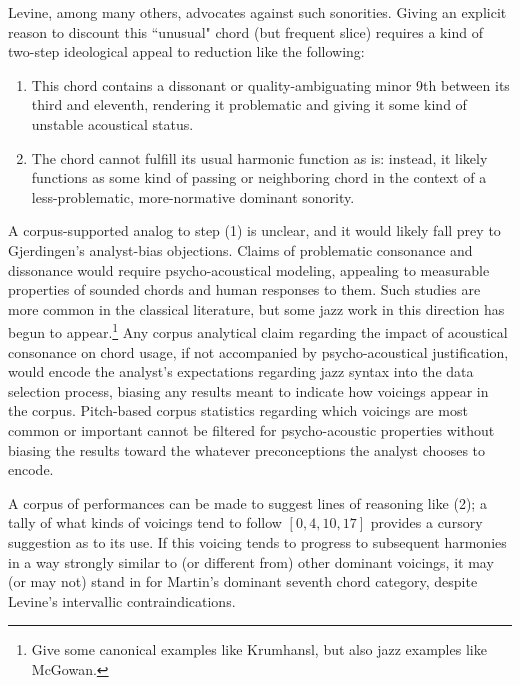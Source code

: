 Levine, among many others, advocates against such sonorities.  Giving an explicit reason to discount this ``unusual" chord (but frequent slice) requires a kind of two-step ideological appeal to reduction like the following:
\begin{enumerate}
	\item This chord contains a dissonant or quality-ambiguating minor 9th between its third and eleventh, rendering it problematic and giving it some kind of unstable acoustical status.
	\item The chord cannot fulfill its usual harmonic function as is: instead, it likely functions as some kind of passing or neighboring chord in the context of a less-problematic, more-normative dominant sonority.
\end{enumerate}
A corpus-supported analog to step (1) is unclear, and it would likely fall prey to Gjerdingen's analyst-bias objections.  Claims of problematic consonance and dissonance would require psycho-acoustical modeling, appealing to measurable properties of sounded chords and human responses to them.  Such studies are more common in the classical literature, but some jazz work in this direction has begun to appear.\footnote{Give some canonical examples like Krumhansl, but also jazz examples  like McGowan.}  Any corpus analytical claim regarding the impact of acoustical consonance on chord usage, if not accompanied by psycho-acoustical justification, would encode the analyst's expectations regarding jazz syntax into the data selection process, biasing any results meant to indicate how voicings appear in the corpus.  Pitch-based corpus statistics regarding which voicings are most common or important cannot be filtered for psycho-acoustic properties without biasing the results toward the whatever preconceptions the analyst chooses to encode.

A corpus of performances can be made to suggest lines of reasoning like (2); a tally of what kinds of voicings tend to follow $[0,4,10,17]$ provides a cursory suggestion as to its use.  If this voicing tends to progress to subsequent harmonies in a way strongly similar to (or different from) other dominant voicings, it may (or may not) stand in for Martin's dominant seventh chord category, despite Levine's intervallic contraindications.

